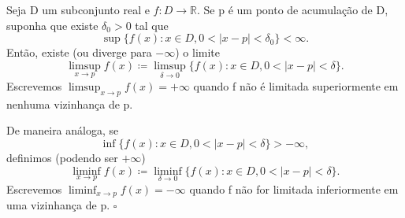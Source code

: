 \documentclass[analysis_notes.tex]{subfiles}
\begin{document}
\begin{def*}
	Seja D um subconjunto real e $f:D\rightarrow \mathbb{R}$. Se p \'e um ponto de acumula\c c\~ao de D, suponha que existe $\delta_{0} > 0$
	tal que
	$$
		\sup{\{f(x):x\in D, 0<|x-p|<\delta_{0}\}} < \infty.
	$$
	Ent\~ao, existe (ou diverge para $-\infty$) o limite
	$$
		\limsup_{x\to p}f(x)\coloneqq \limsup_{\delta\to0}\{f(x):x\in D, 0<|x-p|<\delta\}.
	$$
	Escrevemos $\limsup_{x\to p}f(x) = +\infty$ quando f n\~ao \'e limitada superiormente em nenhuma vizinhan\c ca de p.

	De maneira an\'aloga, se
	$$
		\inf{\{f(x):x\in D, 0<|x-p|<\delta\}} > -\infty,
	$$
	definimos (podendo ser $+\infty$)
	$$
		\liminf_{x\to p}f(x)\coloneqq \liminf_{\delta\to0}\{f(x):x\in D, 0<|x-p|<\delta\}.
	$$
	Escrevemos $\liminf_{x\to p}f(x) = -\infty$ quando f n\~ao for limitada inferiormente em uma vizinhan\c ca de p. $\square$
\end{def*}
\end{document}
